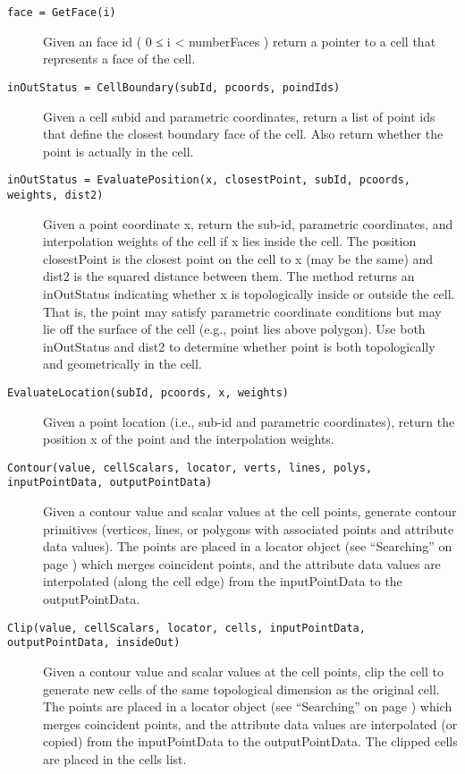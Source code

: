 \begin{description}[leftmargin=0cm,labelindent=0cm]
\begin{description}
    \item[\texttt{face = GetFace(i)}]
    Given an face id ( 0 ≤ i < numberFaces ) return a pointer to a cell that represents a face of the cell.

    \item[\texttt{inOutStatus = CellBoundary(subId, pcoords, poindIds)}]
    Given a cell subid and parametric coordinates, return a list of point ids that define the closest boundary face of the cell. Also return whether the point is actually in the cell.

    \item[\texttt{inOutStatus = EvaluatePosition(x, closestPoint, subId, pcoords, weights, dist2)}]
    Given a point coordinate x, return the sub-id, parametric coordinates, and interpolation weights of the cell if x lies inside the cell. The position closestPoint is the closest point on the cell to x (may be the same) and dist2 is the squared distance between them. The method returns an inOutStatus indicating whether x is topologically inside or outside the cell. That is, the point may satisfy parametric coordinate conditions but may lie off the surface of the cell (e.g., point lies above polygon). Use both inOutStatus and dist2 to determine whether point is both topologically and geometrically in the cell.

    \item[\texttt{EvaluateLocation(subId, pcoords, x, weights)}]
    Given a point location (i.e., sub-id and parametric coordinates), return the position x of the point and the interpolation weights.

    \item[\texttt{Contour(value, cellScalars, locator, verts, lines, polys, inputPointData, outputPointData)}]
    Given a contour value and scalar values at the cell points, generate contour primitives (vertices, lines, or polygons with associated points and attribute data values). The points are placed in a locator object (see ``Searching'' on page \pageref{subsec:searching}) which merges coincident points, and the attribute data values are interpolated (along the cell edge) from the inputPointData to the outputPointData.

    \item[\texttt{Clip(value, cellScalars, locator, cells, inputPointData, outputPointData, insideOut)}]
    Given a contour value and scalar values at the cell points, clip the cell to generate new cells of the same topological dimension as the original cell. The points are placed in a locator object (see ``Searching'' on page \pageref{subsec:searching}) which merges coincident points, and the attribute data values are interpolated (or copied) from the inputPointData to the outputPointData. The clipped cells are placed in the cells list.


\end{description}
\end{description}
